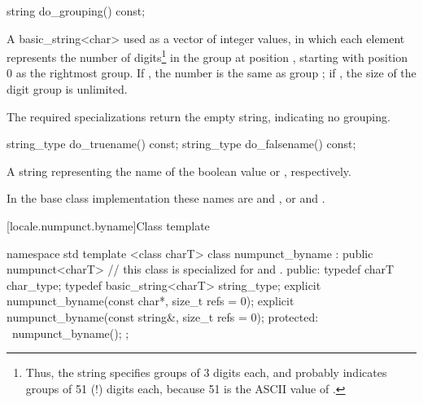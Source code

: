 %
%
\begin{itemdecl}
string do_grouping() const;
\end{itemdecl}

\begin{itemdescr}
\pnum
\returns
A basic_string<char>  used as a vector of integer values,
in which each element
represents the number of digits\footnote{Thus, the string
 specifies groups of 3 digits each, and
 probably indicates groups of 51 (!) digits each,
because 51 is the ASCII value of .}
in the group at position , starting with position 0 as the
rightmost group.
If
,
the number is the same as group
;
if
,
the size of the digit group is unlimited.

\pnum
The required specializations return the empty string, indicating
no grouping.
\end{itemdescr}

%
%
%
%
\begin{itemdecl}
string_type do_truename()  const;
string_type do_falsename() const;
\end{itemdecl}

\begin{itemdescr}
\pnum
\returns
A string representing the name of the boolean value
or
,
respectively.

\pnum
In the base class implementation these names are
 and , or  and .
\end{itemdescr}

[locale.numpunct.byname]{Class template }

%
\begin{codeblock}
namespace std {
  template <class charT>
  class numpunct_byname : public numpunct<charT> {
  // this class is specialized for  and .
  public:
    typedef charT                char_type;
    typedef basic_string<charT>  string_type;
    explicit numpunct_byname(const char*, size_t refs = 0);
    explicit numpunct_byname(const string&, size_t refs = 0);
  protected:
   ~numpunct_byname();
  };
}
\end{codeblock}

